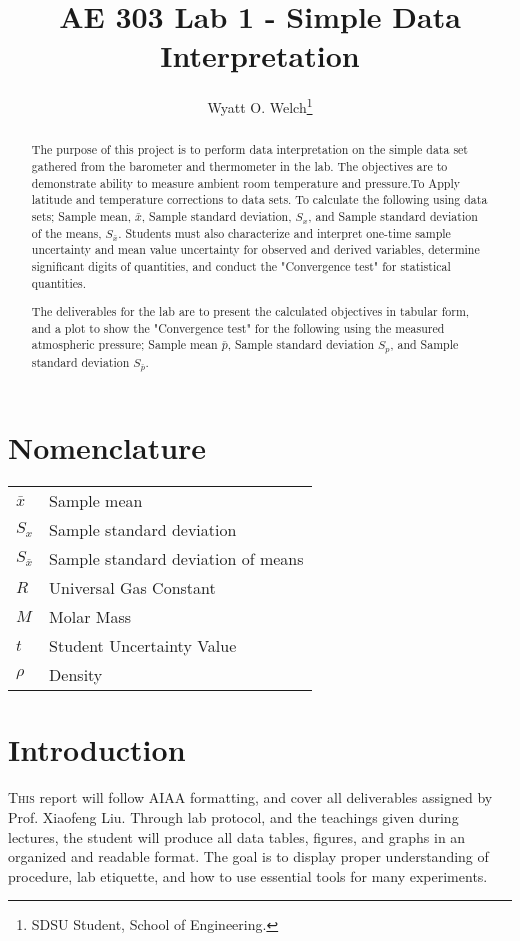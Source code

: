 \documentclass[conf]{new-aiaa}
\title{AE 303 Lab 1 - Simple Data Interpretation}
\author{Wyatt O. Welch\footnote{SDSU Student, School of Engineering.}}
\affil{San Diego State University, San Diego, California, 92182}
\begin{document}
\maketitle

\begin{abstract}
The purpose of this project is to perform data interpretation on the simple data set gathered from the barometer and thermometer in the lab. The objectives are to demonstrate ability to measure ambient room temperature and pressure.To Apply latitude and temperature corrections to data sets. To calculate the following using data sets; Sample mean, $\bar{x}$, Sample standard deviation, $S_x$, and Sample standard deviation of the means, $S_{\bar{x}}$. Students must also characterize and interpret one-time sample uncertainty and mean value uncertainty for observed and derived variables, determine significant digits of quantities, and conduct the "Convergence test" for statistical quantities.
\par
The deliverables for the lab are to present the calculated objectives in tabular form, and a plot to show the "Convergence test" for the following using the measured atmospheric pressure; Sample mean $\bar{p}$, Sample standard deviation $S_p$, and Sample standard deviation $S_{\bar{p}}$.
\end{abstract}

\section{Nomenclature}

{\renewcommand\arraystretch{1.0}
\noindent\begin{longtable*}{@{}l @{\quad=\quad} l@{}}

$\bar{x}$ & Sample mean \\
$S_x$ & Sample standard deviation \\
$S_{\bar{x}}$ & Sample standard deviation of means\\
$R$ & Universal Gas Constant\\
$M$ & Molar Mass\\
$t$ & Student Uncertainty Value\\
$\rho$ & Density

\end{longtable*}}

\section{Introduction}
\lettrine{T}{his} report will follow AIAA formatting, and cover all deliverables assigned by Prof. Xiaofeng Liu. Through lab protocol, and the teachings given during lectures, the student will produce all data tables, figures, and graphs in an organized and readable format. The goal is to display proper understanding of procedure, lab etiquette, and how to use essential tools for many experiments.
\end{document}
